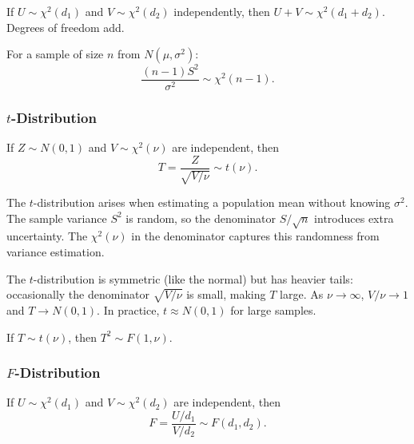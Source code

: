 \begin{remark}
If $U \sim \chi^2(d_1)$ and $V \sim \chi^2(d_2)$ independently, then $U + V \sim \chi^2(d_1 + d_2)$. Degrees of freedom add.
\end{remark}

\begin{remark}
For a sample of size $n$ from $N(\mu,\sigma^2)$:
\[
\frac{(n-1)S^2}{\sigma^2} \sim \chi^2(n-1).
\]
\end{remark}

\subsubsection*{$t$-Distribution}

\begin{definition}[$t$-distribution]
If $Z \sim N(0,1)$ and $V \sim \chi^2(\nu)$ are independent, then
\[
T = \frac{Z}{\sqrt{V/\nu}} \sim t(\nu).
\]
\end{definition}

\begin{remark}[Intuition]
The $t$-distribution arises when estimating a population mean without knowing $\sigma^2$. The sample variance $S^2$ is random, so the denominator $S/\sqrt{n}$ introduces extra uncertainty. The $\chi^2(\nu)$ in the denominator captures this randomness from variance estimation.
\end{remark}

\begin{remark}[Shape]
The $t$-distribution is symmetric (like the normal) but has heavier tails: occasionally the denominator $\sqrt{V/\nu}$ is small, making $T$ large. As $\nu \to \infty$, $V/\nu \to 1$ and $T \to N(0,1)$. In practice, $t \approx N(0,1)$ for large samples.
\end{remark}

\begin{theorem}[$t$ squared is $F$]
If $T \sim t(\nu)$, then $T^2 \sim F(1,\nu)$.
\end{theorem}

\subsubsection*{$F$-Distribution}

\begin{definition}[$F$-distribution]
If $U \sim \chi^2(d_1)$ and $V \sim \chi^2(d_2)$ are independent, then
\[
F = \frac{U/d_1}{V/d_2} \sim F(d_1, d_2).
\]
\end{definition}

